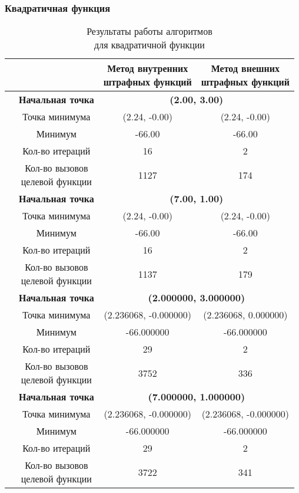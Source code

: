 \subsubsection{Квадратичная функция}

\begin{table}[H]
        \centering
        \vspace*{-1.5em}
        \caption{Результаты работы алгоритмов\\для квадратичной функции}
        \footnotesize
        \begin{tabular}{|c|c|c|c|}
        \hline
        & &\makecell{Метод внутренних\\штрафных функций} &\makecell{Метод внешних\\штрафных функций} \\
        \hline
	\multirow{8}{*}{\rotatebox[origin=c]{90}{$\varepsilon = 0.01$}}&\textbf{Начальная точка} &\multicolumn{2}{c|}{\textbf{(2.00, 3.00)}}\\
	\cline{2-4}
	&Точка минимума &(2.24, -0.00) &(2.24, -0.00) \\ 
	\cline{2-4}
	&Минимум &-66.00 &-66.00 \\ 
	\cline{2-4}
	&Кол-во итераций &16 &2 \\ 
	\cline{2-4}
	&\makecell{Кол-во вызовов\\целевой функции} &1127 &174 \\ 
	\cline{2-4}
\cline{2-4}&\textbf{Начальная точка} &\multicolumn{2}{c|}{\textbf{(7.00, 1.00)}}\\
	\cline{2-4}
	&Точка минимума &(2.24, -0.00) &(2.24, -0.00) \\ 
	\cline{2-4}
	&Минимум &-66.00 &-66.00 \\ 
	\cline{2-4}
	&Кол-во итераций &16 &2 \\ 
	\cline{2-4}
	&\makecell{Кол-во вызовов\\целевой функции} &1137 &179 \\ 
	\cline{2-4}
	\hline
	\multirow{8}{*}{\rotatebox[origin=c]{90}{$\varepsilon = 1e-06$}}&\textbf{Начальная точка} &\multicolumn{2}{c|}{\textbf{(2.000000, 3.000000)}}\\
	\cline{2-4}
	&Точка минимума &(2.236068, -0.000000) &(2.236068, 0.000000) \\ 
	\cline{2-4}
	&Минимум &-66.000000 &-66.000000 \\ 
	\cline{2-4}
	&Кол-во итераций &29 &2 \\ 
	\cline{2-4}
	&\makecell{Кол-во вызовов\\целевой функции} &3752 &336 \\ 
	\cline{2-4}
\cline{2-4}&\textbf{Начальная точка} &\multicolumn{2}{c|}{\textbf{(7.000000, 1.000000)}}\\
	\cline{2-4}
	&Точка минимума &(2.236068, -0.000000) &(2.236068, -0.000000) \\ 
	\cline{2-4}
	&Минимум &-66.000000 &-66.000000 \\ 
	\cline{2-4}
	&Кол-во итераций &29 &2 \\ 
	\cline{2-4}
	&\makecell{Кол-во вызовов\\целевой функции} &3722 &341 \\ 
	\cline{2-4}
	\hline


\end{tabular}
\end{table}
